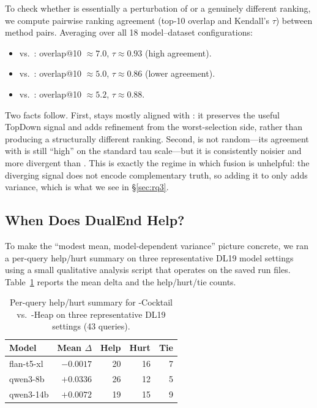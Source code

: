 To check whether \dualend{} is essentially a perturbation of \topdown{} or a genuinely different ranking, we compute pairwise ranking agreement (top-10 overlap and Kendall's $\tau$) between method pairs. Averaging over all 18 model--dataset configurations:
\begin{itemize}[leftmargin=*]
\item \topdown{} vs.\ \dualend{}: overlap@10 $\approx 7.0$, $\tau \approx 0.93$ (high agreement).
\item \topdown{} vs.\ \bottomup{}: overlap@10 $\approx 5.0$, $\tau \approx 0.86$ (lower agreement).
\item \bottomup{} vs.\ \dualend{}: overlap@10 $\approx 5.2$, $\tau \approx 0.88$.
\end{itemize}

Two facts follow. First, \dualend{} stays mostly aligned with \topdown{}: it preserves the useful TopDown signal and adds refinement from the worst-selection side, rather than producing a structurally different ranking. Second, \bottomup{} is not random---its agreement with \topdown{} is still ``high'' on the standard tau scale---but it is consistently noisier and more divergent than \dualend{}. This is exactly the regime in which fusion is unhelpful: the diverging signal does not encode complementary truth, so adding it to \topdown{} only adds variance, which is what we see in \S\ref{sec:rq3}.


\subsection{When Does DualEnd Help?}
\label{sec:when_helps}

To make the ``modest mean, model-dependent variance'' picture concrete, we ran a per-query help/hurt summary on three representative DL19 model settings using a small qualitative analysis script that operates on the saved run files. Table~\ref{tab:when_helps} reports the mean delta and the help/hurt/tie counts.

\begin{table}[!htbp]
\caption{Per-query help/hurt summary for \dualend{}-Cocktail vs.\ \topdown{}-Heap on three representative DL19 settings (43 queries).}
\label{tab:when_helps}
\small
\begin{tabular}{lrrrr}
\toprule
Model & Mean $\Delta$ & Help & Hurt & Tie \\
\midrule
flan-t5-xl & $-0.0017$ & 20 & 16 & 7 \\
qwen3-8b & $+0.0336$ & 26 & 12 & 5 \\
qwen3-14b & $+0.0072$ & 19 & 15 & 9 \\
\bottomrule
\end{tabular}
\end{table}

